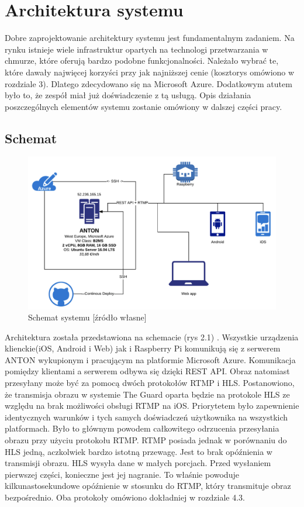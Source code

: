 \chapter{Architektura systemu}

Dobre zaprojektowanie architektury systemu jest fundamentalnym zadaniem. Na rynku istnieje wiele infrastruktur opartych na technologi przetwarzania w chmurze, które oferują bardzo podobne funkcjonalności. Należało wybrać te, które dawały najwięcej korzyści przy jak najniższej cenie (kosztorys omówiono w rozdziale 3). Dlatego zdecydowano się na Microsoft Azure. Dodatkowym atutem było to, że zespół miał już doświadczenie z tą usługą. Opis działania poszczególnych elementów systemu zostanie omówiony w dalszej części pracy.

\section{Schemat}

\begin{figure}[ht] %
   \centering
   \includegraphics[width=12cm]{anton.png} 
   \caption{Schemat systemu [źródło własne]}
\end{figure}

Architektura została przedstawiona na schemacie (rys 2.1) . Wszystkie urządzenia klienckie(iOS, Android i Web) jak i Raspberry Pi komunikują się z serwerem ANTON wykupionym i pracującym na platformie Microsoft Azure. Komunikacja pomiędzy klientami a serwerem odbywa się dzięki REST API. Obraz natomiast przesyłany może być za pomocą dwóch protokołów RTMP i HLS. Postanowiono, że transmisja obrazu w systemie The Guard oparta będzie na protokole HLS ze względu na brak możliwości obsługi RTMP na iOS. Priorytetem było zapewnienie identycznych warunków i tych samych doświadczeń użytkownika na wszystkich platformach. Było to głównym powodem całkowitego odrzucenia przesyłania obrazu przy użyciu protokołu RTMP. RTMP posiada jednak w porównaniu do HLS jedną, aczkolwiek bardzo istotną przewagę. Jest to brak opóźnienia w transmisji obrazu. HLS wysyła dane w małych porcjach. Przed wysłaniem pierwszej części, konieczne jest jej nagranie. To właśnie powoduje kilkunastosekundowe opóźnienie w stosunku do RTMP, który transmituje obraz bezpośrednio. Oba protokoły omówiono dokładniej w rozdziale 4.3.

